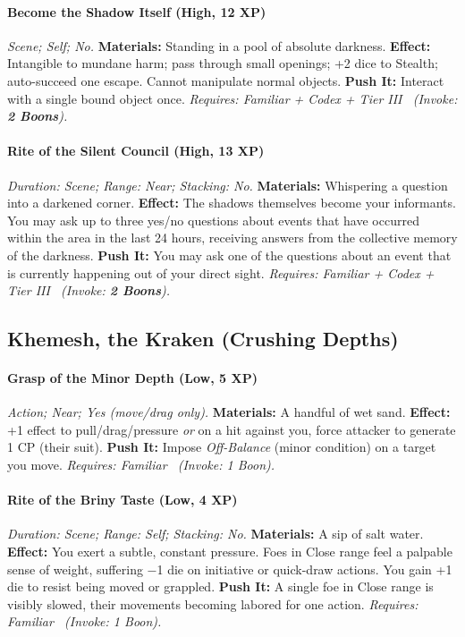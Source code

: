 \documentclass[12pt,twoside]{book}
\begin{document}
\paragraph{Become the Shadow Itself (High, 12 XP)} \emph{Scene; Self; No.}
\textbf{Materials:} Standing in a pool of absolute darkness.
\textbf{Effect:} Intangible to mundane harm; pass through small openings; +2 dice to Stealth; auto-succeed one escape. Cannot manipulate normal objects.
\textbf{Push It:} Interact with a single bound object once.
\emph{Requires: Familiar + Codex + Tier III \ (\textit{Invoke:} \textbf{2 Boons}).}
\paragraph{Rite of the Silent Council (High, 13 XP)} \emph{Duration: Scene; Range: Near; Stacking: No.}
\textbf{Materials:} Whispering a question into a darkened corner.
\textbf{Effect:} The shadows themselves become your informants. You may ask up to three yes/no questions about events that have occurred within the area in the last 24 hours, receiving answers from the collective memory of the darkness.
\textbf{Push It:} You may ask one of the questions about an event that is currently happening out of your direct sight.
\emph{Requires: Familiar + Codex + Tier III \ (\textit{Invoke:} \textbf{2 Boons}).}

\subsection{Khemesh, the Kraken (Crushing Depths)}
\paragraph{Grasp of the Minor Depth (Low, 5 XP)} \emph{Action; Near; Yes (move/drag only).}
\textbf{Materials:} A handful of wet sand.
\textbf{Effect:} +1 effect to pull/drag/pressure \emph{or} on a hit against you, force attacker to generate 1 CP (their suit).
\textbf{Push It:} Impose \emph{Off-Balance} (minor condition) on a target you move.
\emph{Requires: Familiar \ (\textit{Invoke:} 1 Boon).}
\paragraph{Rite of the Briny Taste (Low, 4 XP)} \emph{Duration: Scene; Range: Self; Stacking: No.}
\textbf{Materials:} A sip of salt water.
\textbf{Effect:} You exert a subtle, constant pressure. Foes in Close range feel a palpable sense of weight, suffering −1 die on initiative or quick-draw actions. You gain +1 die to resist being moved or grappled.
\textbf{Push It:} A single foe in Close range is visibly slowed, their movements becoming labored for one action.
\emph{Requires: Familiar \ (\textit{Invoke:} 1 Boon).}
\end{document}
